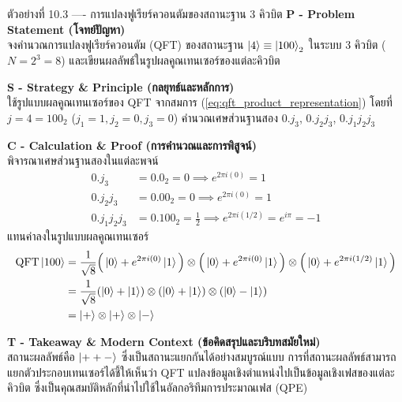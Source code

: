 \begin{psctbox}{ตัวอย่างที่ 10.3 ---- การแปลงฟูเรียร์ควอนตัมของสถานะฐาน 3 คิวบิต}
\noindent\textbf{P - Problem Statement (โจทย์ปัญหา)} \\
จงคำนวณการแปลงฟูเรียร์ควอนตัม (QFT) ของสถานะฐาน $\ket{4} \equiv \ket{100}_2$ ในระบบ 3 คิวบิต ($N=2^3=8$) และเขียนผลลัพธ์ในรูปผลคูณเทนเซอร์ของแต่ละคิวบิต

\vspace{4pt}
\noindent\textbf{S - Strategy \& Principle (กลยุทธ์และหลักการ)} \\
ใช้รูปแบบผลคูณเทนเซอร์ของ QFT จากสมการ (\ref{eq:qft_product_representation}) โดยที่ $j = 4 = 100_2$ ($j_1=1, j_2=0, j_3=0$) คำนวณเศษส่วนฐานสอง $0.j_3$, $0.j_2 j_3$, $0.j_1 j_2 j_3$

\vspace{4pt}
\noindent\textbf{C - Calculation \& Proof (การคำนวณและการพิสูจน์)} \\
พิจารณาเศษส่วนฐานสองในแต่ละพจน์
\begin{align}
0.j_3 &= 0.0_2 = 0 \implies e^{2\pi i (0)} = 1 \\
0.j_2 j_3 &= 0.00_2 = 0 \implies e^{2\pi i (0)} = 1 \\
0.j_1 j_2 j_3 &= 0.100_2 = \frac{1}{2} \implies e^{2\pi i (1/2)} = e^{i\pi} = -1
\end{align}
แทนค่าลงในรูปแบบผลคูณเทนเซอร์
\begin{align}
\text{QFT}\ket{100} &= \frac{1}{\sqrt{8}} \Big( \ket{0} + e^{2\pi i (0)}\ket{1} \Big) \otimes \Big( \ket{0} + e^{2\pi i (0)}\ket{1} \Big) \otimes \Big( \ket{0} + e^{2\pi i (1/2)}\ket{1} \Big) \nonumber \\
&= \frac{1}{\sqrt{8}} (\ket{0}+\ket{1}) \otimes (\ket{0}+\ket{1}) \otimes (\ket{0}-\ket{1}) \nonumber \\
&= \ket{+} \otimes \ket{+} \otimes \ket{-}
\end{align}

\vspace{4pt}
\noindent\textbf{T - Takeaway \& Modern Context (ข้อคิดสรุปและบริบทสมัยใหม่)} \\
สถานะผลลัพธ์คือ $\ket{++-}$ ซึ่งเป็นสถานะแยกกันได้อย่างสมบูรณ์แบบ การที่สถานะผลลัพธ์สามารถแยกตัวประกอบเทนเซอร์ได้ชี้ให้เห็นว่า QFT แปลงข้อมูลเชิงตำแหน่งไปเป็นข้อมูลเชิงเฟสของแต่ละคิวบิต ซึ่งเป็นคุณสมบัติหลักที่นำไปใช้ในอัลกอริทึมการประมาณเฟส (QPE)
\end{psctbox}

